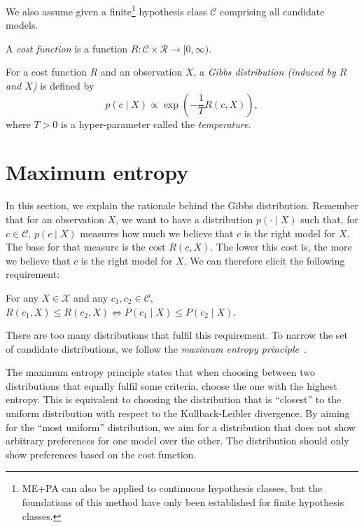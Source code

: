 We also assume given a finite\footnote{ME+PA can also be applied to continuous hypothesis classes, but the foundations of this method have only been established for finite hypothesis classes.} hypothesis class $\mathcal{C}$ comprising all candidate models.

\begin{definition}
A \emph{cost function} is a function $R : \mathcal{C} \times \mathcal{R} \to [0, \infty)$.
\label{def:cost_fun}
\end{definition}

\begin{definition}
For a cost function $R$ and an observation $X$, a \emph{Gibbs distribution (induced by $R$ and $X$)} is defined by
%
\begin{equation}
p(c \mid X) \propto \exp\left(- \frac{1}{T} R(c, X)\right),
\end{equation}
%
where $T > 0$ is a hyper-parameter called the \emph{temperature}.
\label{def:gibbs_dist}
\end{definition}

\section{Maximum entropy}
\label{sec:max_entropy}

In this section, we explain the rationale behind the Gibbs distribution. Remember that for an observation $X$, we want to have a distribution $p(\cdot \mid X)$ such that, for $c \in \mathcal{C}$, $p(c \mid X)$ measures how much we believe that $c$ is the right model for $X$. The base for that measure is the cost $R(c, X)$. The lower this cost is, the more we believe that $c$ is the right model for $X$. We can therefore elicit the following requirement:

\begin{requirement}

For any $X \in \mathcal{X}$ and any $c_1, c_2 \in \mathcal{C}$, $R(c_1, X) \leq R(c_2, X)\Leftrightarrow P(c_1 \mid X) \leq P(c_2 \mid X)$.

\end{requirement}

There are too many distributions that fulfil this requirement. To narrow the set of candidate distributions, we follow the \emph{maximum entropy principle}~\cite{jaynes1957information, jaynes1957information2}. 

The maximum entropy principle states that when choosing between two distributions that equally fulfil some criteria, choose the one with the highest entropy. This is equivalent to choosing the distribution that is ``closest'' to the uniform distribution with respect to the Kullback-Leibler divergence. By aiming for the ``most uniform'' distribution, we aim for a distribution that does not show arbitrary preferences for one model over the other. The distribution should only show preferences based on the cost function.

